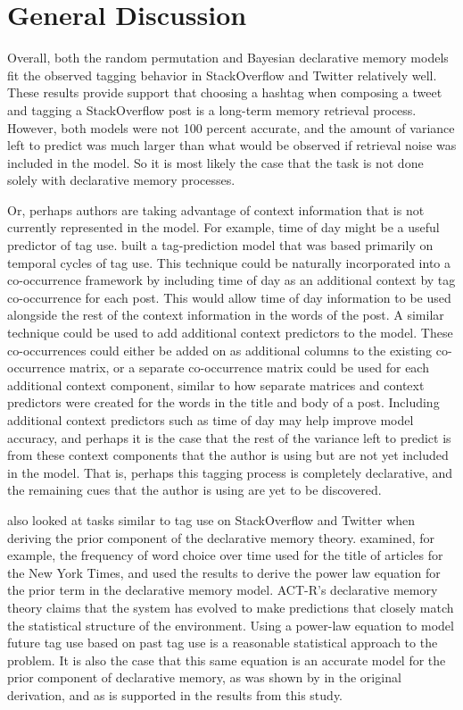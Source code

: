 \documentclass[man,floatsintext,donotrepeattitle]{apa6}
\begin{document}
\section{General Discussion}

Overall, both the random permutation and Bayesian declarative memory models fit the observed tagging behavior in StackOverflow and Twitter relatively well.
These results provide support that choosing a hashtag when composing a tweet and tagging a StackOverflow post is a long-term memory retrieval process.
However, both models were not 100 percent accurate, and the amount of variance left to predict was much larger than what would be observed if retrieval noise was included in the model.
So it is most likely the case that the task is not done solely with declarative memory processes.

Or, perhaps authors are taking advantage of context information that is not currently represented in the model.
For example, time of day might be a useful predictor of tag use.
\textcite{Cohn2012} built a tag-prediction model that was based primarily on temporal cycles of tag use.
This technique could be naturally incorporated into a co-occurrence framework by including time of day as an additional context by tag co-occurrence for each post.
This would allow time of day information to be used alongside the rest of the context information in the words of the post.
A similar technique could be used to add additional context predictors to the model.
These co-occurrences could either be added on as additional columns to the existing co-occurrence matrix,
or a separate co-occurrence matrix could be used for each additional context component, similar to how separate matrices and context predictors were created for the words in the title and body of a post. 
Including additional context predictors such as time of day may help improve model accuracy,
and perhaps it is the case that the rest of the variance left to predict is from these context components that the author is using but are not yet included in the model.
That is, perhaps this tagging process is completely declarative, and the remaining cues that the author is using are yet to be discovered.

\textcite{Anderson1991} also looked at tasks similar to tag use on StackOverflow and Twitter when deriving the prior component of the declarative memory theory.
\citeauthor{Anderson1991} examined, for example, the frequency of word choice over time used for the title of articles for the New York Times,
and used the results to derive the power law equation for the prior term in the declarative memory model.
ACT-R's declarative memory theory claims that the system has evolved to make predictions that closely match the statistical structure of the environment.
Using a power-law equation to model future tag use based on past tag use is a reasonable statistical approach to the problem.
It is also the case that this same equation is an accurate model for the prior component of declarative memory, as was shown by \citeauthor{Anderson1991} in the original derivation, 
and as is supported in the results from this study.
\end{document}
